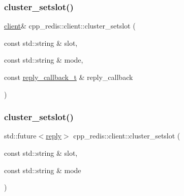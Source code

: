 \subsubsection{\texorpdfstring{cluster\+\_\+setslot()}{cluster\_setslot()}\hspace{0.1cm}{\footnotesize\ttfamily [1/4]}}
{\footnotesize\ttfamily \hyperlink{classcpp__redis_1_1client}{client}\& cpp\+\_\+redis\+::client\+::cluster\+\_\+setslot (\begin{DoxyParamCaption}\item[{const std\+::string \&}]{slot,  }\item[{const std\+::string \&}]{mode,  }\item[{const \hyperlink{classcpp__redis_1_1client_a061a1140d36d2eaeda82b09a0bb3f9f2}{reply\+\_\+callback\+\_\+t} \&}]{reply\+\_\+callback }\end{DoxyParamCaption})}

\mbox{\label{classcpp__redis_1_1client_ad9b75e2c90b1b87fa93a3ac76bd1512f}} 
\subsubsection{\texorpdfstring{cluster\+\_\+setslot()}{cluster\_setslot()}\hspace{0.1cm}{\footnotesize\ttfamily [2/4]}}
{\footnotesize\ttfamily std\+::future$<$\hyperlink{classcpp__redis_1_1reply}{reply}$>$ cpp\+\_\+redis\+::client\+::cluster\+\_\+setslot (\begin{DoxyParamCaption}\item[{const std\+::string \&}]{slot,  }\item[{const std\+::string \&}]{mode }\end{DoxyParamCaption})}

\mbox{\label{classcpp__redis_1_1client_a4e87a3163d16db267136a127e5c843e2}} 
